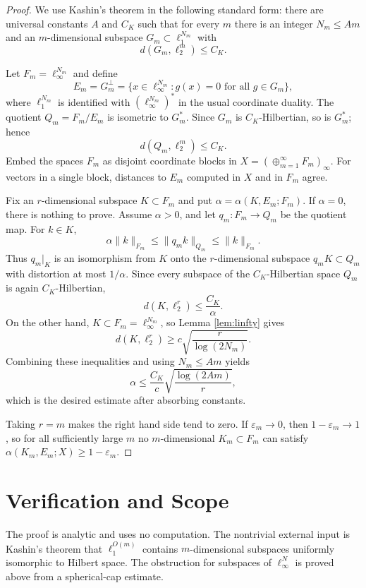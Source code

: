 \documentclass[11pt]{article}
\newcommand{\eps}{\varepsilon}
\begin{document}
\begin{proof}
We use Kashin's theorem in the following standard form: there are universal
constants $A$ and $C_K$ such that for every $m$ there is an integer
$N_m\le Am$ and an $m$-dimensional subspace
$G_m\subset \ell_1^{N_m}$ with
\[
  d(G_m,\ell_2^m)\le C_K.
\]

Let $F_m=\ell_\infty^{N_m}$ and define
\[
  E_m=G_m^\perp
  =\{x\in \ell_\infty^{N_m}: g(x)=0\text{ for all }g\in G_m\},
\]
where $\ell_1^{N_m}$ is identified with $(\ell_\infty^{N_m})^*$ in the usual
coordinate duality.  The quotient $Q_m=F_m/E_m$ is isometric to $G_m^*$.
Since $G_m$ is $C_K$-Hilbertian, so is $G_m^*$; hence
\[
  d(Q_m,\ell_2^m)\le C_K.
\]
Embed the spaces $F_m$ as disjoint coordinate blocks in
$X=(\oplus_{m=1}^\infty F_m)_\infty$.  For vectors in a single block,
distances to $E_m$ computed in $X$ and in $F_m$ agree.

Fix an $r$-dimensional subspace $K\subset F_m$ and put
$\alpha=\alpha(K,E_m;F_m)$.  If $\alpha=0$, there is nothing to prove.
Assume $\alpha>0$, and let $q_m:F_m\to Q_m$ be the quotient map.  For
$k\in K$,
\[
  \alpha\|k\|_{F_m}\le \|q_m k\|_{Q_m}\le \|k\|_{F_m}.
\]
Thus $q_m|_K$ is an isomorphism from $K$ onto the $r$-dimensional subspace
$q_mK\subset Q_m$ with distortion at most $1/\alpha$.  Since every subspace
of the $C_K$-Hilbertian space $Q_m$ is again $C_K$-Hilbertian,
\[
  d(K,\ell_2^r)\le \frac{C_K}{\alpha}.
\]
On the other hand, $K\subset F_m=\ell_\infty^{N_m}$, so Lemma
\ref{lem:linfty} gives
\[
  d(K,\ell_2^r)\ge c\sqrt{\frac{r}{\log(2N_m)}}.
\]
Combining these inequalities and using $N_m\le Am$ yields
\[
  \alpha\le \frac{C_K}{c}\sqrt{\frac{\log(2Am)}{r}},
\]
which is the desired estimate after absorbing constants.

Taking $r=m$ makes the right hand side tend to zero.  If
$\eps_m\to 0$, then $1-\eps_m\to 1$, so for all sufficiently large $m$ no
$m$-dimensional $K_m\subset F_m$ can satisfy
$\alpha(K_m,E_m;X)\ge 1-\eps_m$.
\end{proof}

\section*{Verification and Scope}

The proof is analytic and uses no computation.  The nontrivial external input
is Kashin's theorem that $\ell_1^{O(m)}$ contains $m$-dimensional subspaces
uniformly isomorphic to Hilbert space.  The obstruction for subspaces of
$\ell_\infty^N$ is proved above from a spherical-cap estimate.
\end{document}
